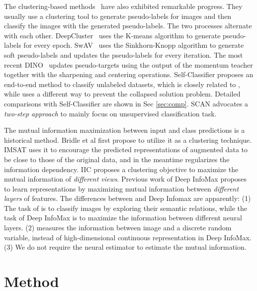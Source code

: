 \documentclass[10pt,twocolumn,letterpaper]{article}
\begin{document}
The clustering-based methods~\cite{caron2018deep, asano2019self, caron2019unsupervised, caron2020unsupervised, li2020prototypical, pmlr-v48-xieb16,yang2016joint} have also exhibited remarkable progress. They usually use a clustering tool to generate pseudo-labels for images and then classify the images with the generated pseudo-labels. The two processes alternate with each other.  DeepCluster~\cite{caron2018deep} uses the K-means algorithm to generate pseudo-labels for every epoch. SwAV~\cite{caron2020unsupervised} uses the Sinkhorn-Knopp algorithm \cite{asano2019self} to generate soft pseudo-labels and updates the pseudo-labels for every iteration. 
The most recent DINO~\cite{caron2021emerging} updates pseudo-targets using the output of the momentum teacher together with the sharpening and centering operations. Self-Classifier \cite{amrani2021self} proposes an end-to-end method to classify unlabeled datasets, which is closely related to \ourmethod, while \ourmethod uses a different way to prevent the collapsed solution problem. Detailed comparisons with Self-Classifier are shown in Sec \ref{sec:comp}. SCAN \cite{van2020scan} advocates a \textit{two-step approach} to mainly focus on unsupervised classification task.

The mutual information maximization between input and class predictions is a historical method. Bridle et al \cite{bridle1992unsupervised} first propose to utilize it as a clustering technique. IMSAT \cite{hu2017learning} uses it to encourage the predicted representations of augmented data to be close to those of the original data, and in the meantime regularizes the information dependency. IIC \cite{Ji_2019_ICCV} proposes a clustering objective to maximize the mutual information of \textit{different views}. Previous work of Deep InfoMax \cite{hjelm2018learning} proposes to learn representations by maximizing mutual information between \textit{different layers} of features.
The differences between \ourmethod and Deep Infomax are apparently: (1) The task of \ourmethod is to classify images by exploring their semantic relations, while the task of Deep InfoMax is to maximize the information between different neural layers. (2) \ourmethod measures the information between image and a discrete random variable, instead of high-dimensional continuous representation in Deep InfoMax. (3) We do not require the neural estimator \cite{belghazi2018mine} to estimate the mutual information.

\section{Method}
\end{document}
